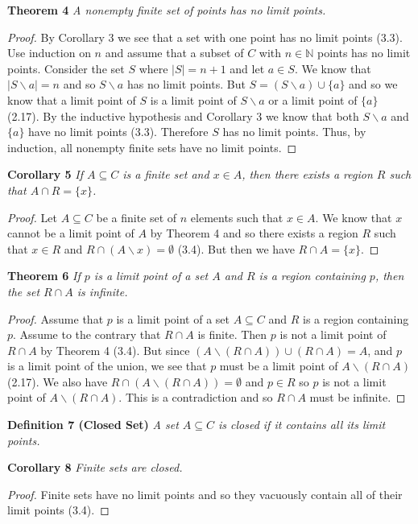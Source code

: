 \documentclass{article}
\begin{document}
\begin{flushleft}
\textbf{Theorem 4}
\textsl{A nonempty finite set of points has no limit points.}
\begin{proof}
By Corollary 3 we see that a set with one point has no limit points (3.3). Use induction on $n$ and assume that a subset of $C$ with $n \in \mathbb{N}$ points has no limit points. Consider the set $S$ where $|S| = n+1$ and let $a \in S$. We know that $|S \backslash a| = n$ and so $S \backslash a$ has no limit points. But $S = (S \backslash a) \cup \{a\}$ and so we know that a limit point of $S$ is a limit point of $S \backslash a$ or a limit point of $\{a\}$ (2.17). By the inductive hypothesis and Corollary 3 we know that both $S \backslash a$ and $\{a\}$ have no limit points (3.3). Therefore $S$ has no limit points. Thus, by induction, all nonempty finite sets have no limit points.
\end{proof}

\textbf{Corollary 5}
\textsl{If $A \subseteq C$ is a finite set and $x \in A$, then there exists a region $R$ such that $A \cap R = \{x\}$.}
\begin{proof}
Let $A \subseteq C$ be a finite set of $n$ elements such that $x \in A$. We know that $x$ cannot be a limit point of $A$ by Theorem 4 and so there exists a region $R$ such that $x \in R$ and $R \cap (A \backslash x) = \emptyset$ (3.4). But then we have $R \cap A = \{x\}$.
\end{proof}

\textbf{Theorem 6}
\textsl{If $p$ is a limit point of a set $A$ and $R$ is a region containing $p$, then the set $R \cap A$ is infinite.}
\begin{proof}
Assume that $p$ is a limit point of a set $A \subseteq C$ and $R$ is a region containing $p$. Assume to the contrary that $R \cap A$ is finite. Then $p$ is not a limit point of $R \cap A$ by Theorem 4 (3.4). But since $(A \backslash (R \cap A)) \cup (R \cap A) = A$, and $p$ is a limit point of the union, we see that $p$ must be a limit point of $A \backslash (R \cap A)$ (2.17). We also have $R \cap (A \backslash (R \cap A)) = \emptyset$ and $p \in R$ so $p$ is not a limit point of $A \backslash (R \cap A)$. This is a contradiction and so $R \cap A$ must be infinite.
\end{proof}

\textbf{Definition 7 (Closed Set)}
\textsl{A set $A \subseteq C$ is closed if it contains all its limit points.}\newline

\textbf{Corollary 8}
\textsl{Finite sets are closed.}
\begin{proof}
Finite sets have no limit points and so they vacuously contain all of their limit points (3.4).
\end{proof}


\end{flushleft}
\end{document}
